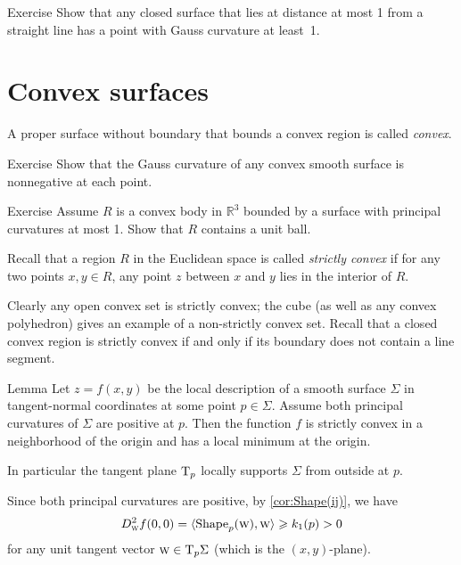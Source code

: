 \begin{thm}{Exercise}\label{ex:positive-gauss}
Show that any closed surface that lies at distance at most 1 from a straight line has a point with Gauss curvature at least~1.
\end{thm}

\section{Convex surfaces}

A proper surface without boundary that bounds a convex region is called \emph{convex}.

\begin{thm}{Exercise}\label{ex:convex-surf}
Show that the Gauss curvature of any convex smooth surface is nonnegative at each point.
\end{thm}

\begin{thm}{Exercise}\label{ex:convex-lagunov}
Assume $R$ is a convex body in $\mathbb{R}^3$ bounded by a surface with principal curvatures at most 1.
Show that $R$ contains a unit ball.
\end{thm}

Recall that a region $R$ in the Euclidean space is called  {}\emph{strictly convex} if for any two points $x,y\in R$, any point $z$ between $x$ and $y$ lies in the interior of $R$.

Clearly any open convex set is strictly convex;
the cube (as well as any convex polyhedron) gives an example of a non-strictly convex set.
Recall that a closed convex region is strictly convex if and only if its boundary does not contain a line segment.

\begin{thm}{Lemma}\label{lem:gauss+=>convexity}
Let $z=f(x,y)$ be the local description of a smooth surface $\Sigma$ in tangent-normal coordinates at some point $p\in\Sigma$.
Assume both principal curvatures of $\Sigma$ are positive at $p$.
Then the function $f$ is strictly convex in a neighborhood of the origin and has a local minimum at the origin.

In particular the tangent plane $\mathrm{T}_p$ locally supports $\Sigma$ from outside at $p$.
\end{thm}

Since both principal curvatures are positive, by \ref{cor:Shape(ij)}, we have 
\[D^2_{\text{\sc{w}}}f(0,0)=\langle \mathop{\rm Shape}\nolimits_p({\text{\sc{w}}}),{\text{\sc{w}}}\rangle\geqslant k_1(p)>0\] 
for any unit tangent vector ${\text{\sc{w}}}\in\mathrm{T}_p\Sigma$ (which is the $(x,y)$-plane).


